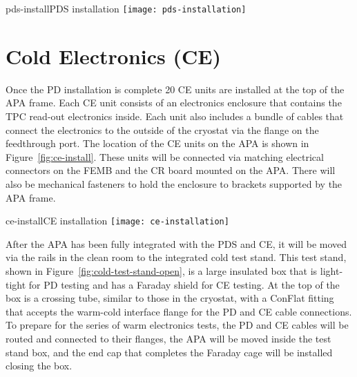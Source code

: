 \begin{cdrfigure}{pds-install}{PDS installation}
\texttt{[image: pds-installation]}
\end{cdrfigure}

\section{Cold Electronics (CE)}
\label{subsec:ce_install}

Once the PD installation is complete 20 CE units are installed at the top of the APA frame.  Each CE unit consists of an electronics enclosure that contains the TPC read-out electronics inside.  Each unit also includes a bundle of cables that connect the electronics to the outside of the cryostat via the flange on the feedthrough port.  %
The location of the CE units on the APA is shown in Figure~\ref{fig:ce-install}.  These units will be connected via matching electrical connectors on the FEMB and the CR board mounted on the APA.  There will also be mechanical fasteners to hold the enclosure to brackets supported by the APA frame.  

\begin{cdrfigure}[CE installation]{ce-install}{CE installation}
\texttt{[image: ce-installation]}
\end{cdrfigure}

After the APA has been fully integrated with the PDS and CE, it will be moved via the rails in the clean room to the integrated cold test stand.  This test stand, shown in Figure~\ref{fig:cold-test-stand-open}, is a large insulated box that is light-tight for PD testing and has a Faraday shield for CE testing.  At the top of the box is a crossing tube, similar to those in the cryostat, with a ConFlat fitting that accepts the warm-cold interface flange for the PD and CE cable connections.  To prepare for the series of warm electronics tests, the PD and CE cables will be routed and connected to their flanges, the APA will be moved inside the test stand box, and the end cap that completes the Faraday cage will be installed closing the box.  

